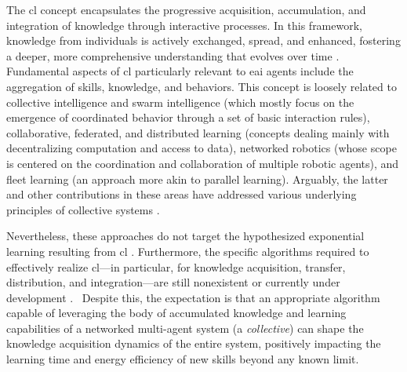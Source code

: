 \documentclass[12pt]{article}
\newcommand\myhl[1]{\textcolor{red}{#1}}
\renewcommand{\emph}[1]{\textit{#1}}
\begin{document}
The \ac{cl} concept encapsulates the progressive acquisition, accumulation, and integration of knowledge through interactive processes. In this framework, knowledge from individuals is actively exchanged, spread, and enhanced, fostering a deeper, more comprehensive understanding that evolves over time \cite{Garavan2012CollectiveLearning}. Fundamental aspects of \ac{cl} particularly relevant to \ac{eai} agents include the aggregation of skills, knowledge, and behaviors. This concept is loosely related to collective intelligence and swarm intelligence \cite{Beni2004SwarmIntelligenceSwarm,Blum2015SwarmIntelligenceOptimization,Dorigo2021SwarmRoboticsPast} (which mostly focus on the emergence of coordinated behavior through a set of basic interaction rules), collaborative, federated, and distributed learning \cite{Technologie2023FLAIROPFederatedLearning,Anjos2023SurveyCollaborativeLearning,Xianjia2021Federatedlearningrobotic,Sartoretti2019DistributedLearningDecentralized,Sartoretti2018DistributedLearningDecentralized,Wang2022DistributedReinforcementLearning} (concepts dealing mainly with decentralizing computation and access to data), networked robotics \cite{Kumar2008NetworkedRobots} (whose scope is centered on the coordination and collaboration of multiple robotic agents), and fleet learning \cite{Wang2023RobotFleetLearning} (an approach more akin to parallel learning). Arguably, the latter and other contributions in these areas have addressed various underlying principles of collective systems \cite{Kernbach2013HandbookCollectiveRobotics}.

Nevertheless, these approaches do not target the hypothesized exponential learning resulting from \ac{cl} \cite{Haddadin2019Breakingwallcollective}. Furthermore, the specific algorithms required to effectively realize \ac{cl}---in particular, for knowledge acquisition, transfer, distribution, and integration---are still nonexistent or currently under development \cite{Haddadin2022collectivelearningtheory}.%
~Despite this, the expectation is that an appropriate algorithm capable of leveraging the body of accumulated knowledge and learning capabilities of a networked multi-agent system (a \emph{collective}) can shape the knowledge acquisition dynamics of the entire system, positively impacting the learning time and energy efficiency of new skills beyond any known limit.
\end{document}
